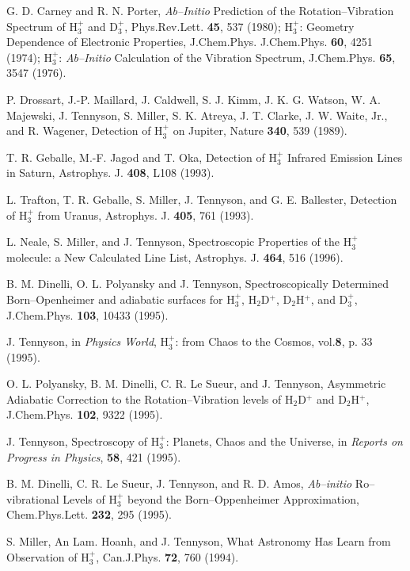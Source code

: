 {{\begin{thebibliography}{999}
{
G. D. Carney and R. N. Porter, 
{\it Ab--Initio} Prediction of the Rotation--Vibration 
Spectrum of H$_3^+$ and D$_3^+$,
Phys.Rev.Lett. {\bf 45}, 537 (1980);
H$_3^+$: Geometry Dependence of Electronic Properties, J.Chem.Phys. 
J.Chem.Phys. {\bf 60}, 4251 (1974);
H$_3^+$: {\it Ab--Initio} Calculation of the Vibration Spectrum,
J.Chem.Phys. {\bf 65}, 3547 (1976).

P. Drossart, J.-P. Maillard, J. Caldwell, S. J. Kimm,
J. K. G. Watson, W. A. Majewski, J. Tennyson, S. Miller, S. K. Atreya,
J. T. Clarke, J. W. Waite, Jr., and R. Wagener, 
Detection of H$_3^+$ on Jupiter,
Nature {\bf 340},
539 (1989).

T. R. Geballe, M.-F. Jagod and T. Oka, 
Detection of H$_3^+$ Infrared Emission Lines
in Saturn,
Astrophys. J. {\bf 408},
L108 (1993).

L. Trafton, T. R. Geballe, S. Miller, J. Tennyson, and
G. E. Ballester, 
Detection of H$_3^+$ from Uranus,
Astrophys. J. {\bf 405}, 761 (1993).

L. Neale, S. Miller, and J. Tennyson, 
Spectroscopic Properties of the H$_3^+$ molecule:
a New Calculated Line List,
Astrophys. J. {\bf 464}, 516
(1996).

B. M. Dinelli, O. L. Polyansky and J. Tennyson, 
Spectroscopically Determined Born--Openheimer and
adiabatic surfaces for 
H$_3^+$, H$_2$D$^+$, D$_2$H$^+$, and D$_3^+$,
J.Chem.Phys. {\bf 103},
10433 (1995).

J. Tennyson, in {\em Physics World}, 
H$_3^+$: from Chaos to the Cosmos,
vol.{\bf 8}, p. 33 (1995).

O. L. Polyansky, B. M. Dinelli, C. R. Le Sueur, and J. Tennyson,
Asymmetric Adiabatic Correction to the Rotation--Vibration levels
of H$_2$D$^+$ and D$_2$H$^+$,
J.Chem.Phys. {\bf 102}, 9322 (1995).

J. Tennyson, 
Spectroscopy of H$_3^+$: Planets, Chaos and the Universe,
in {\em Reports on Progress in Physics}, {\bf 58},
421 (1995).

B. M. Dinelli, C. R. Le Sueur, J. Tennyson, and R. D. Amos,
{\it Ab--initio} Ro--vibrational Levels of H$_3^+$ beyond the
Born--Oppenheimer Approximation,
Chem.Phys.Lett. {\bf 232}, 295 (1995).

S. Miller, An Lam. Hoanh, and J. Tennyson,
What Astronomy Has Learn from Observation of H$_3^+$,
Can.J.Phys. {\bf 72}, 760 (1994).

}
\end{thebibliography}}}
